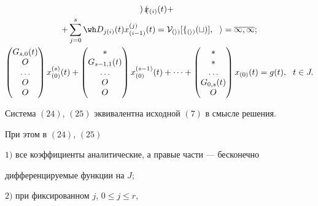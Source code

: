 \begin{thm}
\begin{gather}
\begin{pmatrix}
\end{pmatrix} x_{(i)}(t)+ \notag \\


%


+ \sum_{j=0}^{s} \wh D_{j(i)}(t) x_{(i-1)}^{(j)}(t)=


\cal V_{(i)}[f_{(i)}(t)], \ \ i=\overline{1,\infty}; \\


%


\begin{pmatrix}


G_{s,0}(t) \\ O \\ \dotsc \\ O \\ O 


\end{pmatrix} x_{(0)}^{(s)}(t)+


\begin{pmatrix}


\ast \\ G_{s-1,1}(t) \\ \dotsc \\ O \\ O 


\end{pmatrix} x_{(0)}^{(s-1)}(t)+ \dotsb +


\begin{pmatrix}


\ast \\ \ast \\ \dotsc \\ G_{0,s}(t) \\ O 


\end{pmatrix} x_{(0)}(t)=g(t), \ \ t \in J.


\end{gather}





Система $(24)$, $(25)$ эквивалентна исходной $(7)$ в смысле решения.


При этом в $(24)$, $(25)$





\noindent{}$1)$ все коэффициенты аналитические, а правые части --- бесконечно


дифференцируемые функции на $J;$





\noindent{}$2)$ при фиксированном $j$, $0 \le j \le r$, \;



\end{thm}
